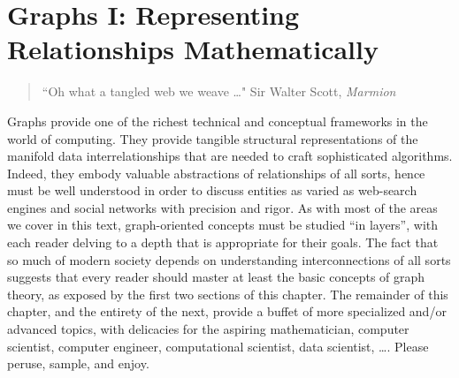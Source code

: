 
\chapter{Graphs I:
Representing Relationships Mathematically}
\label{ch:Graphs1}

\begin{quote}
``Oh what a tangled web we weave \ldots" 
\hspace*{1in}Sir Walter Scott, {\it Marmion}
\end{quote}

\bigskip

\noindent
Graphs provide one of the richest technical and conceptual frameworks in the world of computing.  They provide tangible structural representations of the manifold data interrelationships that are needed to craft sophisticated algorithms.  Indeed, they embody valuable abstractions of relationships of all sorts, hence must be well understood in order to discuss entities as varied as web-search engines and social networks with precision and rigor.  As with most of the areas we cover in this text, graph-oriented concepts must be studied ``in layers'', with each reader delving to a depth that is appropriate for their goals.   The fact that so much of modern society depends on understanding interconnections of all sorts suggests that every reader should master at least the basic concepts of graph theory, as exposed by the first two sections of this chapter.  The remainder of this chapter, and the entirety of the next, provide a buffet of more specialized and/or advanced topics, with delicacies for the aspiring mathematician, computer scientist,  computer engineer, computational scientist, data scientist, \ldots.  Please peruse, sample, and enjoy.

\smallskip

